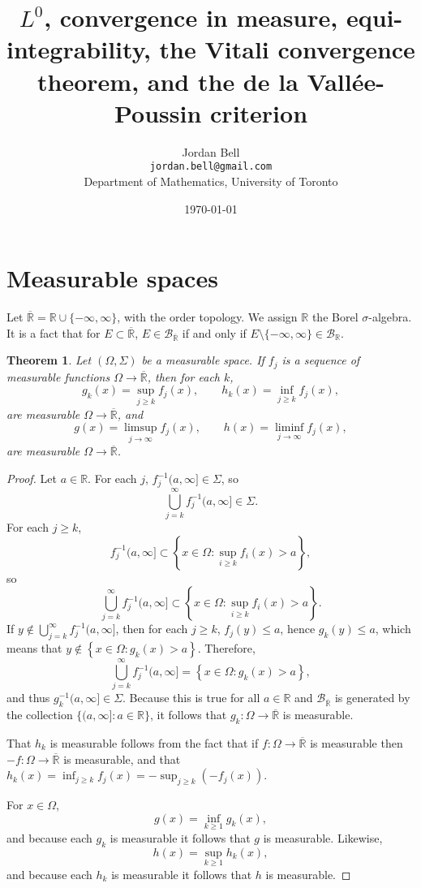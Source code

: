 \documentclass{article}
\newtheorem{theorem}{Theorem}
\theoremstyle{definition}
\begin{document}
\title{$L^0$, convergence in measure,  equi-integrability, the Vitali convergence theorem, and the de la Vall\'ee-Poussin criterion}
\author{Jordan Bell\\ \texttt{jordan.bell@gmail.com}\\Department of Mathematics, University of Toronto}
\date{\today}

\maketitle

\section{Measurable spaces}
Let $\overline{\mathbb{R}}=\mathbb{R} \cup \{-\infty,\infty\}$, with the order topology.
We assign $\mathbb{R}$ the Borel $\sigma$-algebra. 
It is a fact that for $E \subset \overline{\mathbb{R}}$,
 $E \in \mathscr{B}_{\overline{\mathbb{R}}}$
if and only if  $E \setminus \{-\infty,\infty\} \in \mathscr{B}_{\mathbb{R}}$.


\begin{theorem}
Let $(\Omega,\Sigma)$ be a measurable space. 
If $f_j$ is a sequence of measurable functions $\Omega \to \overline{\mathbb{R}}$, then for each $k$,
\[
g_k(x)= \sup_{j \geq k} f_j(x), \qquad h_k(x)=  \inf_{j \geq k} f_j(x),
\]
are measurable $\Omega \to \overline{\mathbb{R}}$, and
\[
g(x) = \limsup_{j \to \infty} f_j(x), \qquad h(x) = \liminf_{j \to \infty} f_j(x),
\]
are measurable $\Omega \to \overline{\mathbb{R}}$.
\label{supmeasurable}
\end{theorem}
\begin{proof}
Let $a \in \mathbb{R}$. For each $j$, $f_j^{-1}(a,\infty] \in \Sigma$, so
\[
\bigcup_{j=k}^\infty f_j^{-1}(a,\infty] \in \Sigma.
\]
For each $j \geq k$,
\[
f_j^{-1}(a,\infty] \subset \left\{ x \in \Omega: \sup_{i \geq k} f_i(x) > a \right\},
\]
so
\[
\bigcup_{j=k}^\infty f_j^{-1}(a,\infty] \subset \left\{ x \in \Omega: \sup_{i \geq k} f_i(x) > a \right\}.
\]
If $y \not \in \bigcup_{j=k}^\infty f_j^{-1}(a,\infty]$, then for each $j \geq k$, $f_j(y) \leq a$, hence
$g_k(y) \leq a$, which means that
$y \not \in \left\{ x \in \Omega: g_k(x) > a \right\}$. Therefore,
\[
\bigcup_{j=k}^\infty f_j^{-1}(a,\infty]
=\left\{ x \in \Omega: g_k(x) > a \right\},
\]
and thus
$g_k^{-1}(a,\infty] \in \Sigma$. Because this is true for all $a \in \mathbb{R}$ and
$\mathscr{B}_{\overline{\mathbb{R}}}$ is generated by the collection 
$\{(a,\infty]: a \in \mathbb{R}\}$, it follows that $g_k:\Omega \to \overline{\mathbb{R}}$ is measurable. 

That $h_k$ is measurable follows from the fact that if $f:\Omega \to \overline{\mathbb{R}}$ is measurable
then $-f:\Omega \to \overline{\mathbb{R}}$ is measurable, and that
$h_k(x)=\inf_{j \geq k} f_j(x) = -\sup_{j \geq k} (-f_j(x))$. 

For $x \in \Omega$,
\[
g(x) = \inf_{k \geq 1} g_k(x),
\]
and because each $g_k$ is measurable it follows that $g$ is measurable. Likewise,
\[
h(x) = \sup_{k \geq 1} h_k(x),
\]
and because each $h_k$ is measurable it follows that $h$ is measurable.
\end{proof}
\end{document}
